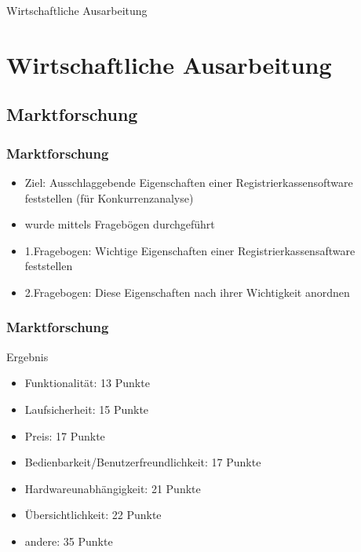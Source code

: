 \documentclass[12pt]{beamer}
\begin{document}
\begin{frame}
	\begin{Large}
		\begin{center}
			Wirtschaftliche Ausarbeitung
		\end{center}
	\end{Large}
\end{frame}

\section{Wirtschaftliche Ausarbeitung}
\subsection{Marktforschung}
\begin{frame}
\frametitle{Marktforschung}
\begin{itemize}
\item Ziel: Ausschlaggebende Eigenschaften einer Registrierkassensoftware feststellen (für Konkurrenzanalyse)
\item wurde mittels Fragebögen durchgeführt
\item 1.Fragebogen: Wichtige Eigenschaften einer Registrierkassensaftware feststellen
\item 2.Fragebogen: Diese Eigenschaften nach ihrer Wichtigkeit anordnen
\end{itemize}
\end{frame}
\begin{frame}
\frametitle{Marktforschung}
Ergebnis
\begin{itemize}
\item Funktionalität: 13 Punkte
\item Laufsicherheit: 15 Punkte
\item Preis: 17 Punkte
\item Bedienbarkeit/Benutzerfreundlichkeit: 17 Punkte
\item Hardwareunabhängigkeit: 21 Punkte
\item Übersichtlichkeit: 22 Punkte
\item andere: 35 Punkte
\end{itemize}
\end{frame}
\end{document}
